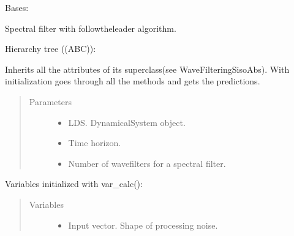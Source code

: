 \documentclass[letterpaper,10pt,english]{sphinxmanual}
\begin{document}
\begin{fulllineitems}
\label{\detokenize{LDS.LDS.filters:LDS.LDS.filters.wave_filtering_siso_ftl.WaveFilteringSisoFtl}}
\sphinxAtStartPar
Bases: {\hyperref[\detokenize{LDS.LDS.filters:LDS.LDS.filters.wave_filtering_siso_abs.WaveFilteringSisoAbs}]{}}

\sphinxAtStartPar
Spectral filter with follow\sphinxhyphen{}the\sphinxhyphen{}leader algorithm.

\sphinxAtStartPar
Hierarchy tree ((ABC)):

\noindent{}

\sphinxAtStartPar
Inherits all the attributes of its superclass(see WaveFilteringSisoAbs).
With initialization goes through all the methods and gets the predictions.
\begin{quote}\begin{description}
\item[{Parameters}] \leavevmode\begin{itemize}
\item {} 
\sphinxAtStartPar
{} \textendash{} LDS. DynamicalSystem object.

\item {} 
\sphinxAtStartPar
{} \textendash{} Time horizon.

\item {} 
\sphinxAtStartPar
{} \textendash{} Number of wave\sphinxhyphen{}filters for a spectral filter.

\end{itemize}

\end{description}\end{quote}

\sphinxAtStartPar
Variables initialized with var\_calc():
\begin{quote}\begin{description}
\item[{Variables}] \leavevmode\begin{itemize}
\item {} 
\sphinxAtStartPar
{} \textendash{} Input vector. Shape of processing noise.


\end{itemize}
\end{description}
\end{quote}
\end{fulllineitems}
\end{document}
